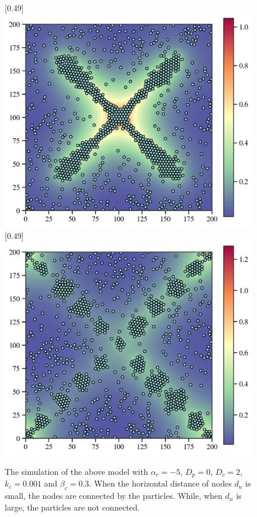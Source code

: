 \documentclass{article}
\begin{document}
\begin{figure}[htbp]
    \centering
    [0.49\linewidth]{
      \includegraphics[width=\linewidth]{figs/simpleModeling1.png}
    }
    \hfill
    [0.49\linewidth]{
      \includegraphics[width=\linewidth]{figs/simpleModeling2.png}
    }
    \caption{
        The simulation of the above model with $\alpha_c=-5$, $D_p=0$, $D_c=2$, $k_c=0.001$ and $\beta_c=0.3$. When the horizontal distance of nodes $d_n$ is small, the nodes are connected by the particles. While, when $d_n$ is large, the particles are not connected. 
    }
\end{figure}
\end{document}
